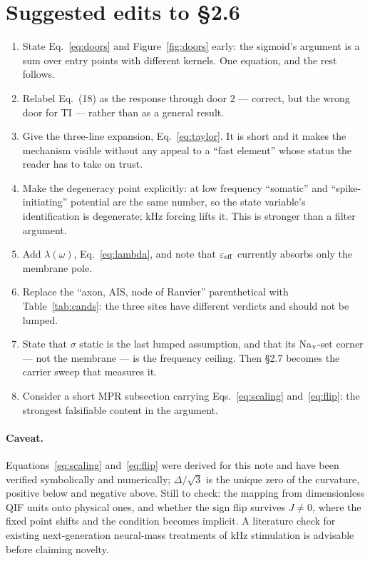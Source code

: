 \documentclass[11pt,a4paper]{article}
\begin{document}
\section{Suggested edits to \S2.6}

\begin{enumerate}[leftmargin=1.6em,itemsep=2pt]
\item State Eq.~\eqref{eq:doors} and Figure~\ref{fig:doors} early: the sigmoid's argument is a sum over
      entry points with different kernels. One equation, and the rest follows.
\item Relabel Eq.~(18) as the response through door 2 --- correct, but the wrong door for TI --- rather
      than as a general result.
\item Give the three-line expansion, Eq.~\eqref{eq:taylor}. It is short and it makes the mechanism
      visible without any appeal to a ``fast element'' whose status the reader has to take on trust.
\item Make the degeneracy point explicitly: at low frequency ``somatic'' and ``spike-initiating''
      potential are the same number, so the state variable's identification is degenerate; kHz forcing
      lifts it. This is stronger than a filter argument.
\item Add $\lambda(\omega)$, Eq.~\eqref{eq:lambda}, and note that $\varepsilon_{\rm eff}$ currently
      absorbs only the membrane pole.
\item Replace the ``axon, AIS, node of Ranvier'' parenthetical with Table~\ref{tab:cands}: the three
      sites have different verdicts and should not be lumped.
\item State that $\sigma$ static is the last lumped assumption, and that its Na$_{\rm v}$-set corner ---
      not the membrane --- is the frequency ceiling. Then \S2.7 becomes the carrier sweep that measures it.
\item Consider a short MPR subsection carrying Eqs.~\eqref{eq:scaling} and~\eqref{eq:flip}: the
      strongest falsifiable content in the argument.
\end{enumerate}

\paragraph{Caveat.} Equations~\eqref{eq:scaling} and~\eqref{eq:flip} were derived for this note and have
been verified symbolically and numerically; $\Delta/\sqrt3$ is the unique zero of the curvature, positive
below and negative above. Still to check: the mapping from dimensionless QIF units onto physical ones,
and whether the sign flip survives $J\neq0$, where the fixed point shifts and the condition becomes
implicit. A literature check for existing next-generation neural-mass treatments of kHz stimulation is
advisable before claiming novelty.
\end{document}
